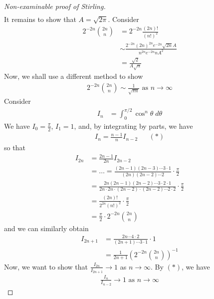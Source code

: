 \documentclass{../../template/note}
\begin{document}
\begin{proof}[Non-examinable proof of Stirling]
\begin{align*}
        \end{align*}
        It remains to show that \(A = \sqrt{2\pi}\). Consider
        \begin{align*}
            2^{-2n}\binom{2n}{n} &= 2^{-2n} \frac{(2n)!}{(n!)^2} \\
            &\sim \frac{2^{-2n} (2n)^{2n} e^{-2n} \sqrt{2n} A}{n^{2n}e^{-2n}nA^2} \\
            &= \frac{\sqrt 2}{A \sqrt n}
        \end{align*}
        Now, we shall use a different method to show
        \begin{align*}
            2^{-2n} \binom{2n}{n} \sim \frac{1}{\sqrt{\pi n}} \text{ as }n \to \infty
        \end{align*}
        Consider
        \begin{align*}
            I_n &= \int_0^{\pi/2} \cos^n \theta \; d\theta
        \end{align*}
        We have \(I_0 = \frac{\pi}{2}\), \(I_1 = 1\), and, by integrating by parts, we have
        \begin{align*}
            I_n = \frac{n-1}{n} I_{n-2} && (*)
        \end{align*}
        so that
        \begin{align*}
            I_{2n} &= \frac{2n-1}{2n} I_{2n-2} \\
            &= \dots = \frac{(2n-1)(2n-3)\cdots 3 \cdot 1}{(2n)(2n-2) \cdots 2} \cdot \frac{\pi}{2} \\
            &= \frac{2n(2n-1)(2n-2) \cdots 3 \cdot 2 \cdot 1}{2n \cdot 2n \cdot (2n-2) \cdot (2n-2) \cdots 2 \cdot 2} \cdot \frac{\pi}{2} \\
            &= \frac{(2n)!}{2^{2n}(n!)^2} \cdot \frac{\pi}{2} \\
            &= \frac{\pi}{2} \cdot 2^{-2n} \binom{2n}{n}
        \end{align*}
        and we can similarly obtain
        \begin{align*}
            I_{2n+1} &= \frac{2n \cdots 4 \cdot 2}{(2n+1) \cdots 3 \cdot 1} \cdot 1 \\
            &= \frac{1}{2n+1} \left(2^{-2n} \binom{2n}{n}\right)^{-1}
        \end{align*}
        Now, we want to show that \(\frac{I_{2n}}{I_{2n+1}} \to 1\) as \(n \to \infty\). By \((*)\), we have
        \begin{align*}
            \frac{I_n}{I_{n-2}} \to 1 \text{ as } n \to \infty
        \end{align*}

\end{proof}
\end{document}
